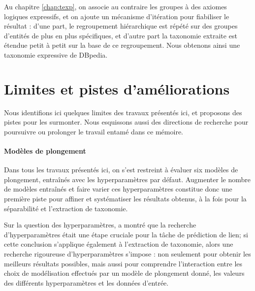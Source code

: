 Au chapitre \ref{chap:texp}, on associe au contraire les groupes à des axiomes logiques expressifs, et on ajoute un mécanisme d'itération pour fiabiliser le résultat : d'une part, le regroupement hiérarchique est répété sur des groupes d'entités de plus en plus spécifiques, et d'autre part la taxonomie extraite est étendue petit à petit sur la base de ce regroupement. Nous obtenons ainsi une taxonomie expressive de DBpedia.






\section{Limites et pistes d'améliorations}

Nous identifions ici quelques limites des travaux présentés ici, et proposons des pistes pour les surmonter. Nous esquissons aussi des directions de recherche pour poursuivre ou prolonger le travail entamé dans ce mémoire.


\paragraph{Modèles de plongement}

Dans tous les travaux présentés ici, on s'est restreint à évaluer six modèles de plongement, entraînés avec les hyperparamètres par défaut. Augmenter le nombre de modèles entraînés et faire varier ces hyperparamètres constitue donc une première piste pour affiner et systématiser les résultats obtenus, à la fois pour la séparabilité et l'extraction de taxonomie. 

Sur la question des hyperparamètres, \cite{kadlec2017knowledge} a montré que la recherche d'hyperparamètres était une étape cruciale pour la tâche de prédiction de lien; si cette conclusion s'applique également à l'extraction de taxonomie, alors une recherche rigoureuse d'hyperparamètres s'impose : non seulement pour obtenir les meilleurs résultats possibles, mais aussi pour comprendre l'interaction entre les choix de modélisation effectués par un modèle de plongement donné, les valeurs des différents hyperparamètres et les données d'entrée. 

